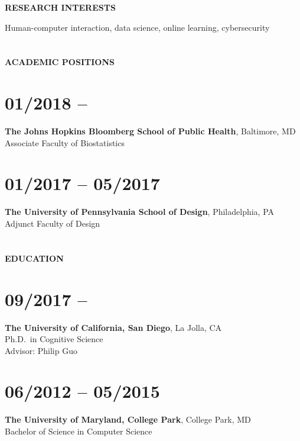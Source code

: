 \textbf{RESEARCH INTERESTS}
\vspace{0.05in}

Human-computer interaction, data science, online learning, cybersecurity

\section{} \vspace{0.125in} \textbf{ACADEMIC POSITIONS} \vspace{-0.5em}

\section{01/2018 --}
\textbf{The Johns Hopkins Bloomberg School of Public Health}, Baltimore, MD \\
Associate Faculty of Biostatistics

\section{01/2017 -- 05/2017}
\textbf{The University of Pennsylvania School of Design}, Philadelphia, PA \\
Adjunct Faculty of Design

\section{} \vspace{0.1in} \textbf{EDUCATION} \vspace{-0.5em}

\section{09/2017 --}

\textbf{The University of California, San Diego}, La Jolla, CA \\
Ph.D.\ in Cognitive Science \\
Advisor: Philip Guo %

\section{06/2012 -- 05/2015}

\textbf{The University of Maryland, College Park}, College Park, MD \\ Bachelor
of Science in Computer Science

